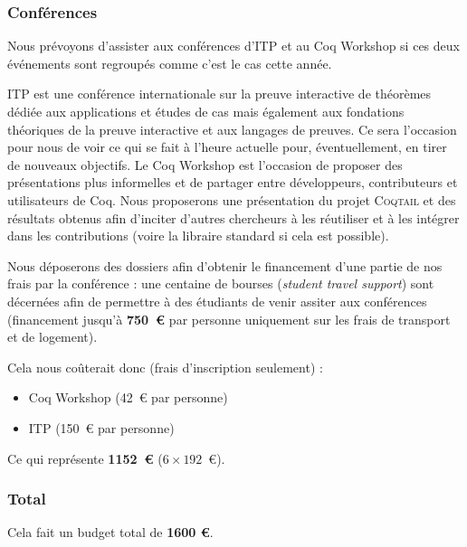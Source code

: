 \documentclass[11pt]{article}
\newcommand{\coqtail}{\textsc{Coqtail}}
\begin{document}
\subsubsection{Conférences}
Nous prévoyons d'assister aux conférences d'ITP et au Coq Workshop si ces deux événements sont regroupés comme c'est le cas cette année.

ITP est une conférence internationale sur la preuve interactive de théorèmes dédiée aux applications et études de cas mais également aux fondations théoriques de la preuve interactive et aux langages de preuves. Ce sera l'occasion pour nous de voir ce qui se fait à l'heure actuelle pour, éventuellement, en tirer de nouveaux objectifs. Le Coq Workshop est l'occasion de proposer des présentations plus informelles et de partager entre développeurs, contributeurs et utilisateurs de Coq. Nous proposerons une présentation du projet \coqtail{} et des résultats obtenus afin d'inciter d'autres chercheurs à les réutiliser et à les intégrer dans les contributions (voire la libraire standard si cela est possible).

Nous déposerons des dossiers afin d'obtenir le financement d'une partie de nos frais par la conférence : une centaine de bourses (\emph{student travel support}) sont décernées afin de permettre à des étudiants de venir assiter aux conférences (financement jusqu'à \textbf{750~€} par personne uniquement sur les frais de transport et de logement).

Cela nous coûterait donc (frais d'inscription seulement) :
\begin{itemize}
	\item Coq Workshop (42~€ par personne)
	\item ITP (150~€ par personne)
\end{itemize}

Ce qui représente \textbf{1152~€} ($6 \times 192$~€).

\subsubsection{Total}

Cela fait un budget total de \textbf{1600 €}.

\printbibliography
\end{document}
